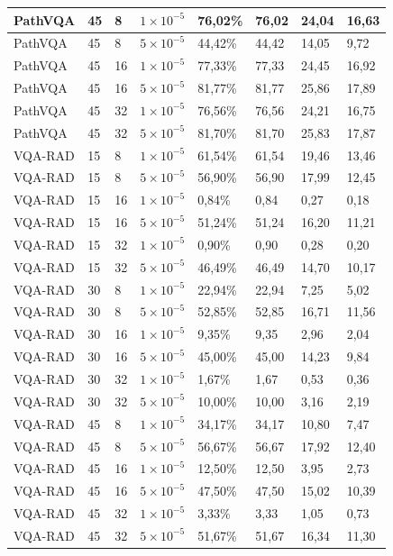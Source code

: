 \begin{longtable}[c]{|l|l|l|l|l|l|l|l|}
    PathVQA & 45 & 8  & $1 \times 10^{-5}$ & 76,02\% & 76,02 & 24,04 & 16,63 \\ \hline
    PathVQA & 45 & 8  & $5 \times 10^{-5}$ & 44,42\% & 44,42 & 14,05 & 9,72  \\ \hline
    PathVQA & 45 & 16 & $1 \times 10^{-5}$ & 77,33\% & 77,33 & 24,45 & 16,92 \\ \hline
    PathVQA & 45 & 16 & $5 \times 10^{-5}$ & 81,77\% & 81,77 & 25,86 & 17,89 \\ \hline
    PathVQA & 45 & 32 & $1 \times 10^{-5}$ & 76,56\% & 76,56 & 24,21 & 16,75 \\ \hline
    PathVQA & 45 & 32 & $5 \times 10^{-5}$ & 81,70\% & 81,70 & 25,83 & 17,87 \\ \hline
    VQA-RAD & 15 & 8  & $1 \times 10^{-5}$ & 61,54\% & 61,54 & 19,46 & 13,46 \\ \hline
    VQA-RAD & 15 & 8  & $5 \times 10^{-5}$ & 56,90\% & 56,90 & 17,99 & 12,45 \\ \hline
    VQA-RAD & 15 & 16 & $1 \times 10^{-5}$ & 0,84\%  & 0,84  & 0,27  & 0,18  \\ \hline
    VQA-RAD & 15 & 16 & $5 \times 10^{-5}$ & 51,24\% & 51,24 & 16,20 & 11,21 \\ \hline
    VQA-RAD & 15 & 32 & $1 \times 10^{-5}$ & 0,90\%  & 0,90  & 0,28  & 0,20  \\ \hline
    VQA-RAD & 15 & 32 & $5 \times 10^{-5}$ & 46,49\% & 46,49 & 14,70 & 10,17 \\ \hline
    VQA-RAD & 30 & 8  & $1 \times 10^{-5}$ & 22,94\% & 22,94 & 7,25  & 5,02  \\ \hline
    VQA-RAD & 30 & 8  & $5 \times 10^{-5}$ & 52,85\% & 52,85 & 16,71 & 11,56 \\ \hline
    VQA-RAD & 30 & 16 & $1 \times 10^{-5}$ & 9,35\%  & 9,35  & 2,96  & 2,04  \\ \hline
    VQA-RAD & 30 & 16 & $5 \times 10^{-5}$ & 45,00\% & 45,00 & 14,23 & 9,84  \\ \hline
    VQA-RAD & 30 & 32 & $1 \times 10^{-5}$ & 1,67\%  & 1,67  & 0,53  & 0,36  \\ \hline
    VQA-RAD & 30 & 32 & $5 \times 10^{-5}$ & 10,00\% & 10,00 & 3,16  & 2,19  \\ \hline
    VQA-RAD & 45 & 8  & $1 \times 10^{-5}$ & 34,17\% & 34,17 & 10,80 & 7,47  \\ \hline
    VQA-RAD & 45 & 8  & $5 \times 10^{-5}$ & 56,67\% & 56,67 & 17,92 & 12,40 \\ \hline
    VQA-RAD & 45 & 16 & $1 \times 10^{-5}$ & 12,50\% & 12,50 & 3,95  & 2,73  \\ \hline
    VQA-RAD & 45 & 16 & $5 \times 10^{-5}$ & 47,50\% & 47,50 & 15,02 & 10,39 \\ \hline
    VQA-RAD & 45 & 32 & $1 \times 10^{-5}$ & 3,33\%  & 3,33  & 1,05  & 0,73  \\ \hline
    VQA-RAD & 45 & 32 & $5 \times 10^{-5}$ & 51,67\% & 51,67 & 16,34 & 11,30 \\ \hline
    \end{longtable}

